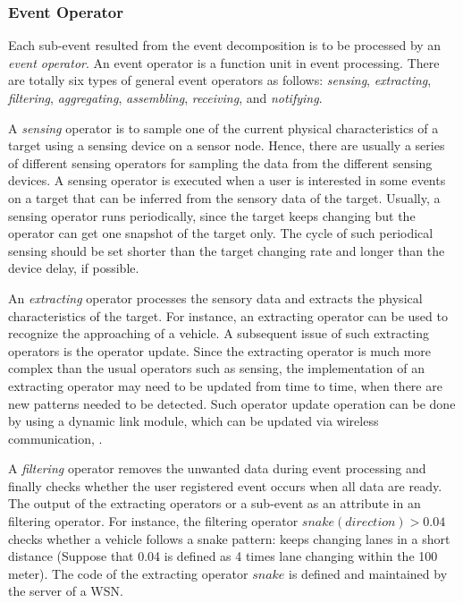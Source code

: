 \documentclass[12pt,journal,draftcls,letterpaper,onecolumn]{elsarticle}
\begin{document}
\subsubsection{Event Operator}

Each sub-event resulted from the event decomposition is to be
processed by an \emph{event operator}. An event operator is a
function unit in event processing. There are totally six types of
general event operators as follows: \emph{sensing},
\emph{extracting}, \emph{filtering}, \emph{aggregating},
\emph{assembling}, \emph{receiving}, and \emph{notifying}.

A \emph{sensing} operator is to sample one of the current physical
characteristics of a target using a sensing device on a sensor node.
Hence, there are usually a series of different sensing operators for
sampling the data from the different sensing devices. A sensing
operator is executed when a user is interested in some events on a
target that can be inferred from the sensory data of the target.
Usually, a sensing operator runs periodically, since the target
keeps changing but the operator can get one snapshot of the target
only. The cycle of such periodical sensing should be set shorter
than the target changing rate and longer than the device delay, if
possible.

An \emph{extracting} operator processes the sensory data and
extracts the physical characteristics of the target. For instance,
an extracting operator can be used to recognize the approaching of a
vehicle. A subsequent issue of such extracting operators is the
operator update. Since the extracting operator is much more complex
than the usual operators such as sensing, the implementation of an
extracting operator may need to be updated from time to time, when
there are new patterns needed to be detected. Such operator update
operation can be done by using a dynamic link module, which can be
updated via wireless communication\cite{1067188}, \cite{1160178}.

A \emph{filtering} operator removes the unwanted data during event
processing and finally checks whether the user registered event
occurs when all data are ready. The output of the extracting
operators or a sub-event as an attribute in an filtering operator.
For instance, the filtering operator $snake(direction)>0.04$ checks
whether a vehicle follows a snake pattern: keeps changing lanes in a
short distance (Suppose that 0.04 is defined as 4 times lane
changing within the 100 meter). The code of the extracting operator
$snake$ is defined and maintained by the server of a WSN.
\end{document}
